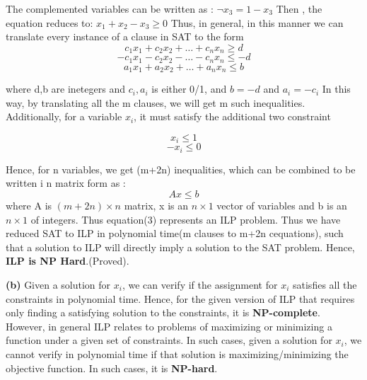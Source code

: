 \documentclass{article}
\renewcommand\part[1]{\vspace{.10in}\textbf{(#1)}}
\begin{document}
The complemented variables can be written as :\newline
\hspace*{1cm} $\neg x_{3} = 1 - x_{3}$ \newline
Then , the equation reduces to: \newline
\hspace*{1cm} $x_{1} + x_{2} - x_{3} \geq 0$ \newline
Thus, in general, in this manner we can translate every instance of a clause in SAT to the form \newline
  \[c_{1}x_{1} + c_{2}x_{2} + \dots + c_{n}x_{n} \geq d\]
  \[-c_{1}x_{1} - c_{2}x_{2} - \dots - c_{n}x_{n} \leq -d\]
  \[a_{1}x_{1} + a_{2}x_{2} + \dots + a_{n}x_{n} \leq b\]

where d,b are inetegers and $c_{i},a_{i}$ is either 0/1, and $b = -d$ and $a_{i} = -c_{i}$ \newline
In this way, by translating all the m clauses, we will get m such inequalities. Additionally, for a variable $x_{i}$, it must satisfy the additional two constraint 

\[x_{i} \leq 1\]
\[-x_{i} \leq 0\]

Hence, for n variables, we get (m+2n) inequalities, which can be combined to be written  i n matrix form as : \newline
\begin{equation}
   Ax \leq b
\end{equation}
where A is $(m+2n) \times n$ matrix, x is an $n \times 1$ vector of variables and b is an $n \times 1$ of integers. Thus equation(3) represents an ILP problem. \newline
Thus we have reduced SAT to ILP in polynomial time(m clauses to m+2n cequations), such that a solution to ILP will directly imply a solution to the SAT problem. Hence, \textbf {ILP is NP Hard}.(Proved). \newline

\part{b}
Given a solution for $x_{i}$, we can verify if the assignment for $x_{i}$ satisfies all the constraints in polynomial time. Hence, for the given version of ILP that requires only finding a satisfying solution to the constraints, it is \textbf {NP-complete}. However, in general ILP relates to problems of maximizing or minimizing a function under a given set of constraints. In such cases, given a solution for $x_{i}$, we cannot verify in polynomial time if that solution is maximizing/minimizing the objective function. In such cases, it is \textbf {NP-hard}. \newline
\end{document}
